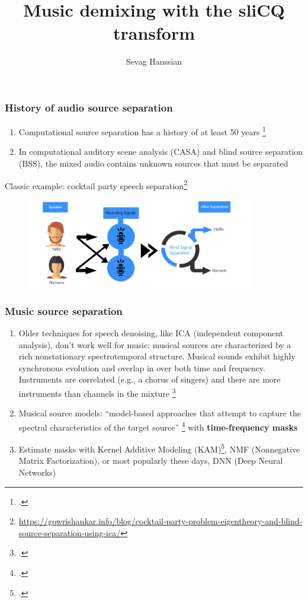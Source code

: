\documentclass[usenames,dvipsnames]{beamer}
\title{Music demixing with the sliCQ transform}
\author{Sevag Hanssian}
\date{}
\begin{document}
\begin{frame}
\maketitle
\end{frame}

\begin{frame}
	\frametitle{History of audio source separation}
	\begin{enumerate}
		\item
			Computational source separation has a history of at least 50 years \footcite{musicmask, musicsepintro1}
		\item
			In computational auditory scene analysis (CASA) and blind source separation (BSS), the mixed audio contains unknown sources that must be separated
	\end{enumerate}
	Classic example: cocktail party speech separation\footnote{\url{https://gowrishankar.info/blog/cocktail-party-problem-eigentheory-and-blind-source-separation-using-ica/}}
	\begin{figure}
		\centering
		\includegraphics[width=10cm]{./images-mml-presentation/bss.png}
	\end{figure}
\end{frame}

\begin{frame}
	\frametitle{Music source separation}
	\begin{enumerate}
		\item
			Older techniques for speech denoising, like ICA (independent component analysis), don't work well for music: musical sources are characterized by a rich nonstationary spectrotemporal structure. Musical sounds exhibit highly synchronous evolution and overlap in over both time and frequency. Instruments are correlated (e.g., a chorus of singers) and there are more instruments than channels in the mixture \footcite[1]{musicsepintro1}
		\item
			Musical source models: ``model-based approaches that attempt to capture the spectral characteristics of the target source'' \footcite[36]{musicsepgood} with \textbf{time-frequency masks}
		\item
			Estimate masks with Kernel Additive Modeling (KAM)\footcite{fitzgerald1}, NMF (Nonnegative Matrix Factorization), or most popularly these days, DNN (Deep Neural Networks)
	\end{enumerate}
\end{frame}
\end{document}
